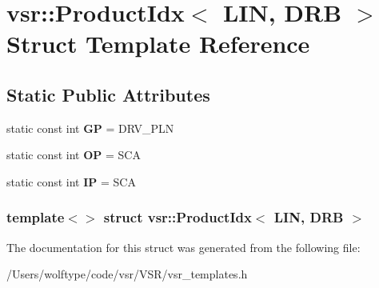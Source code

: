 \hypertarget{structvsr_1_1_product_idx_3_01_l_i_n_00_01_d_r_b_01_4}{\section{vsr\-:\-:Product\-Idx$<$ L\-I\-N, D\-R\-B $>$ Struct Template Reference}
\label{structvsr_1_1_product_idx_3_01_l_i_n_00_01_d_r_b_01_4}
}
\subsection*{Static Public Attributes}
\begin{DoxyCompactItemize}
\item 
\hypertarget{structvsr_1_1_product_idx_3_01_l_i_n_00_01_d_r_b_01_4_a913b6c52b8256c4a410b9c5aab969b73}{static const int {\bfseries G\-P} = D\-R\-V\-\_\-\-P\-L\-N}\label{structvsr_1_1_product_idx_3_01_l_i_n_00_01_d_r_b_01_4_a913b6c52b8256c4a410b9c5aab969b73}

\item 
\hypertarget{structvsr_1_1_product_idx_3_01_l_i_n_00_01_d_r_b_01_4_a2e73c9e2ff9d6ba68302a54bfed82e22}{static const int {\bfseries O\-P} = S\-C\-A}\label{structvsr_1_1_product_idx_3_01_l_i_n_00_01_d_r_b_01_4_a2e73c9e2ff9d6ba68302a54bfed82e22}

\item 
\hypertarget{structvsr_1_1_product_idx_3_01_l_i_n_00_01_d_r_b_01_4_aee96abf2098470d7a66e54fe6d88b8b1}{static const int {\bfseries I\-P} = S\-C\-A}\label{structvsr_1_1_product_idx_3_01_l_i_n_00_01_d_r_b_01_4_aee96abf2098470d7a66e54fe6d88b8b1}

\end{DoxyCompactItemize}
\subsubsection*{template$<$$>$ struct vsr\-::\-Product\-Idx$<$ L\-I\-N, D\-R\-B $>$}



The documentation for this struct was generated from the following file\-:\begin{DoxyCompactItemize}
\item 
/\-Users/wolftype/code/vsr/\-V\-S\-R/vsr\-\_\-templates.\-h\end{DoxyCompactItemize}
